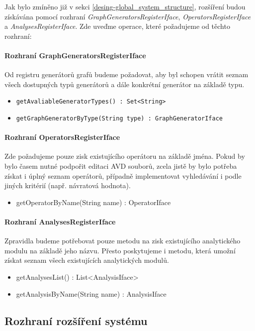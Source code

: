 Jak bylo zmíněno již v sekci \ref{desing-global_system_structure}, rozšíření budou získávána pomocí rozhraní \emph{GraphGeneratorsRegisterIface}, \emph{OperatorsRegisterIface} a \emph{AnalysesRegisterIface}. Zde uveďme operace, které požadujeme od těchto rozhraní:

\paragraph{Rozhraní GraphGeneratorsRegisterIface} Od registru generátorů grafů budeme požadovat, aby byl schopen vrátit seznam všech dostupných typů generátorů a dále konkrétní generátor na základě typu.
\begin{itemize}
\item \verb-getAvaliableGeneratorTypes() : Set<String>-
\item \verb-getGraphGeneratorByType(String type) : GraphGeneratorIface-
\end{itemize}

\paragraph{Rozhraní OperatorsRegisterIface}
Zde požadujeme pouze zisk existujícího operátoru na základě jména. Pokud by bylo časem nutné podpořit editaci AVD souborů, zcela jistě by bylo potřeba získat i úplný seznam operátorů, případně implementovat vyhledávání i podle jiných kritérií (např. návratová hodnota).

\begin{itemize}
\item getOperatorByName(String name) : OperatorIface
\end{itemize}

\paragraph{Rozhraní AnalysesRegisterIface} Zpravidla budeme potřebovat pouze metodu na zisk existujícího analytického modulu na základě jeho názvu. Přesto poskytujeme i metodu, která umožní získat seznam všech existujících analytických modulů.

\begin{itemize}
\item getAnalysesList() : List<AnalysisIface>
\item getAnalysisByName(String name) : AnalysisIface
\end{itemize}

\subsection{Rozhraní rozšíření systému}

